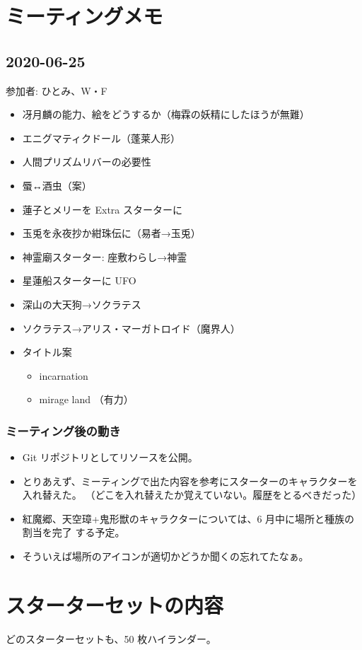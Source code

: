 \documentclass[line_length=22zw,number_of_lines=45,twocolumn]{jlreq}
\begin{document}
\section{ミーティングメモ}
\subsection{2020-06-25}
参加者: ひとみ、W・F
\begin{itemize}
	\item 冴月麟の能力、絵をどうするか（梅霖の妖精にしたほうが無難）
	\item エニグマティクドール（蓬莱人形）
	\item 人間プリズムリバーの必要性
	\item 蜃↔酒虫（案）
	\item 蓮子とメリーを Extra スターターに
	\item 玉兎を永夜抄か紺珠伝に（易者→玉兎）
	\item 神霊廟スターター: 座敷わらし→神霊
	\item 星蓮船スターターに UFO
	\item 深山の大天狗→ソクラテス
	\item ソクラテス→アリス・マーガトロイド（魔界人）
	\item タイトル案
		\begin{itemize}
			\item incarnation
			\item mirage land （有力）
		\end{itemize}
\end{itemize}

\subsubsection*{ミーティング後の動き}
\begin{itemize}
	\item Git リポジトリとしてリソースを公開。
	\item とりあえず、ミーティングで出た内容を参考にスターターのキャラクターを入れ替えた。
		（どこを入れ替えたか覚えていない。履歴をとるべきだった）
	\item 紅魔郷、天空璋+鬼形獣のキャラクターについては、6 月中に場所と種族の割当を完了
		する予定。
	\item そういえば場所のアイコンが適切かどうか聞くの忘れてたなぁ。
\end{itemize}


\section{スターターセットの内容}
どのスターターセットも、50 枚ハイランダー。
\clearpage\small
\end{document}
